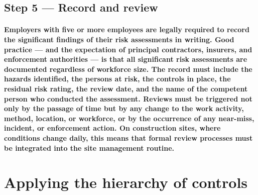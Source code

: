 \subsection{Step 5 --- Record and review}
\paragraph{Employers with five or more employees are legally required to record the significant findings of their risk assessments in writing. Good practice --- and the expectation of principal contractors, insurers, and enforcement authorities --- is that all significant risk assessments are documented regardless of workforce size. The record must include the hazards identified, the persons at risk, the controls in place, the residual risk rating, the review date, and the name of the competent person who conducted the assessment. Reviews must be triggered not only by the passage of time but by any change to the work activity, method, location, or workforce, or by the occurrence of any near-miss, incident, or enforcement action. On construction sites, where conditions change daily, this means that formal review processes must be integrated into the site management routine.}


\section{Applying the hierarchy of controls}

